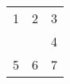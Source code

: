 \begin{tabular}{rrrrr}
\multicolumn{2}{r}{1} &
  2 &
  \multicolumn{2}{r}{3}
  \\
\multicolumn{5}{r}{4}
  \\
5 &
  \multicolumn{3}{r}{6} &
  7
  \\
\end{tabular}%
